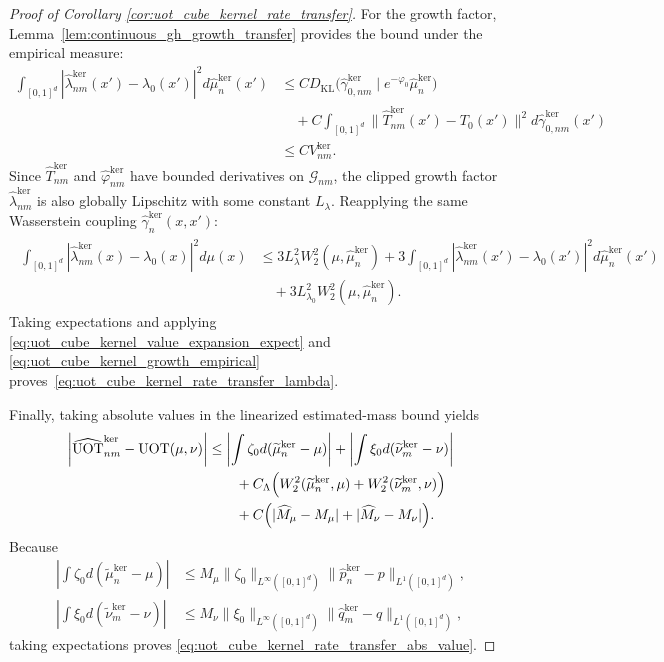 \documentclass[11pt,reqno]{amsart}
\theoremstyle{definition}
\newcommand{\KL}{\mathrm{KL}}
\renewcommand{\hat}{\widehat}
\renewcommand{\tilde}{\widetilde}
\begin{document}
\begin{proof}[Proof of Corollary \ref{cor:uot_cube_kernel_rate_transfer}]
For the growth factor, Lemma~\ref{lem:continuous_gh_growth_transfer} provides the bound under the empirical measure:
\begin{align}
\label{eq:uot_cube_kernel_growth_empirical}
    \int_{[0,1]^d}
    |\hat\lambda_{nm}^{\mathrm{ker}}(x')-\lambda_0(x')|^2 d\hat\mu_n^{\mathrm{ker}}(x')
    &\le
    C {D_\KL}\bigl(\hat\gamma_{0,nm}^{\mathrm{ker}}\mid e^{-\varphi_0}\hat\mu_n^{\mathrm{ker}}\bigr) \\
    &\quad + C \int_{[0,1]^d}
    \|\hat T_{nm}^{\mathrm{ker}}(x')-T_0(x')\|^2 d\hat\gamma_{0,nm}^{\mathrm{ker}}(x') \nonumber \\
    &\le C V_{nm}^{\mathrm{ker}}.
\end{align}
Since $\hat T_{nm}^{\mathrm{ker}}$ and $\hat\varphi_{nm}^{\mathrm{ker}}$ have bounded derivatives on $\mathcal{G}_{nm}$, the clipped growth factor $\hat\lambda_{nm}^{\mathrm{ker}}$ is also globally Lipschitz with some constant $L_\lambda$. Reapplying the same Wasserstein coupling $\hat\gamma_n^{\mathrm{ker}}(x,x')$:
\begin{align}
\begin{aligned}
    \int_{[0,1]^d} |\hat\lambda_{nm}^{\mathrm{ker}}(x)-\lambda_0(x)|^2 d\mu(x) 
    &\le 3 L_\lambda^2 W_2^2(\mu, \hat\mu_n^{\mathrm{ker}}) 
    + 3 \int_{[0,1]^d} |\hat\lambda_{nm}^{\mathrm{ker}}(x')-\lambda_0(x')|^2 d\hat\mu_n^{\mathrm{ker}}(x') \\
    &\quad + 3 L_{\lambda_0}^2 W_2^2(\mu, \hat\mu_n^{\mathrm{ker}}).
\end{aligned}
\end{align}
Taking expectations and applying \eqref{eq:uot_cube_kernel_value_expansion_expect} and \eqref{eq:uot_cube_kernel_growth_empirical} proves~\eqref{eq:uot_cube_kernel_rate_transfer_lambda}.

Finally, taking absolute values in the linearized estimated-mass bound yields
\begin{align*}
    \left|
        \widehat{\mathrm{UOT}}_{nm}^{\mathrm{ker}}
        -
        \mathrm{UOT}(\mu,\nu)
    \right|
    &\le
    \left|
        \int \zeta_0 d(\tilde\mu_n^{\mathrm{ker}}-\mu)
    \right|
    +
    \left|
        \int \xi_0 d(\tilde\nu_m^{\mathrm{ker}}-\nu)
    \right| \\
    &\qquad +
    C_\Lambda\Bigl(
    W_2^2(\tilde\mu_n^{\mathrm{ker}},\mu)
    +
    W_2^2(\tilde\nu_m^{\mathrm{ker}},\nu)
    \Bigr) \\
    &\qquad +
    C\Bigl(
    |\hat M_\mu-M_\mu|+|\hat M_\nu-M_\nu|
    \Bigr).
\end{align*}
Because
\begin{align*}
    \left|\int \zeta_0 d(\tilde\mu_n^{\mathrm{ker}}-\mu)\right|
    &\le
    M_\mu\|\zeta_0\|_{L^\infty([0,1]^d)}
    \|\hat p_n^{\mathrm{ker}}-p\|_{L^1([0,1]^d)},
    \\
    \left|\int \xi_0 d(\tilde\nu_m^{\mathrm{ker}}-\nu)\right|
    &\le
    M_\nu\|\xi_0\|_{L^\infty([0,1]^d)}
    \|\hat q_m^{\mathrm{ker}}-q\|_{L^1([0,1]^d)},
\end{align*}
taking expectations proves \eqref{eq:uot_cube_kernel_rate_transfer_abs_value}.
\end{proof}
\end{document}
